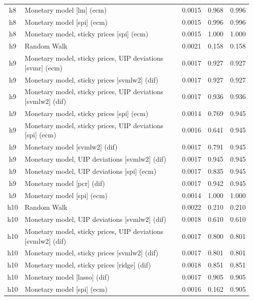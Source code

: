 \begin{ThreePartTable}
\begin{longtable}[t]{cp{5.5cm}ccc}
h8 & \raggedright Monetary model [lm] (ecm) & 0.0015 & 0.968 & 0.996\\
h8 & \raggedright Monetary model [spi] (ecm) & 0.0015 & 0.996 & 0.996\\
h8 & \raggedright Monetary model, sticky prices [spi] (ecm) & 0.0015 & 1.000 & 1.000\\
\addlinespace
h9 & \raggedright Random Walk & 0.0021 & 0.158 & 0.158\\
h9 & \raggedright Monetary model, sticky prices, UIP deviations [svmr] (ecm) & 0.0017 & 0.927 & 0.927\\
h9 & \raggedright Monetary model, sticky prices [svmlw2] (dif) & 0.0017 & 0.927 & 0.927\\
h9 & \raggedright Monetary model, sticky prices, UIP deviations [svmlw2] (dif) & 0.0017 & 0.936 & 0.936\\
h9 & \raggedright Monetary model, sticky prices [spi] (ecm) & 0.0014 & 0.769 & 0.945\\
h9 & \raggedright Monetary model, sticky prices, UIP deviations [spi] (ecm) & 0.0016 & 0.641 & 0.945\\
h9 & \raggedright Monetary model [svmlw2] (dif) & 0.0017 & 0.791 & 0.945\\
h9 & \raggedright Monetary model, UIP deviations [svmlw2] (dif) & 0.0017 & 0.945 & 0.945\\
h9 & \raggedright Monetary model, UIP deviations [spi] (ecm) & 0.0017 & 0.835 & 0.945\\
h9 & \raggedright Monetary model [pcr] (dif) & 0.0017 & 0.942 & 0.945\\
h9 & \raggedright Monetary model [spi] (ecm) & 0.0014 & 1.000 & 1.000\\
\addlinespace
h10 & \raggedright Random Walk & 0.0022 & 0.210 & 0.210\\
h10 & \raggedright Monetary model, UIP deviations [svmlw2] (dif) & 0.0018 & 0.610 & 0.610\\
h10 & \raggedright Monetary model, sticky prices, UIP deviations [svmlw2] (dif) & 0.0017 & 0.800 & 0.801\\
h10 & \raggedright Monetary model, sticky prices [svmlw2] (dif) & 0.0017 & 0.801 & 0.801\\
h10 & \raggedright Monetary model, sticky prices [ridge] (dif) & 0.0018 & 0.851 & 0.851\\
h10 & \raggedright Monetary model [lasso] (dif) & 0.0017 & 0.905 & 0.905\\
h10 & \raggedright Monetary model [spi] (ecm) & 0.0016 & 0.162 & 0.905\\

\end{longtable}
\end{ThreePartTable}
